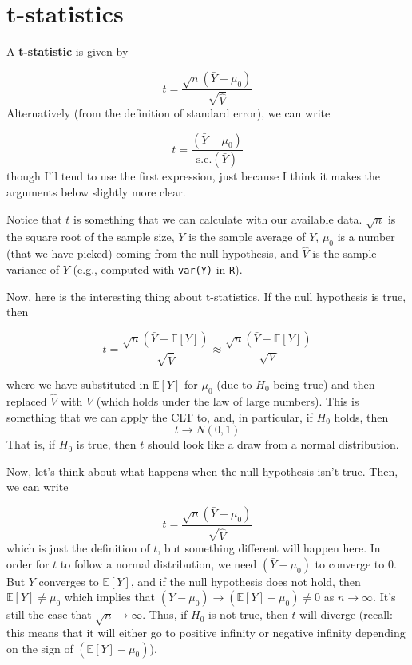 \documentclass[
  letterpaper,
  DIV=11,
  numbers=noendperiod]{scrreprt}
\begin{document}
\section{t-statistics}\label{t-statistics}

A \textbf{t-statistic} is given by

\[
  t = \frac{\sqrt{n} (\bar{Y} - \mu_0)}{\sqrt{\hat{V}}}
\] Alternatively (from the definition of standard error), we can write

\[
  t = \frac{(\bar{Y} - \mu_0)}{\textrm{s.e.}(\bar{Y})}
\] though I'll tend to use the first expression, just because I think it
makes the arguments below slightly more clear.

Notice that \(t\) is something that we can calculate with our available
data. \(\sqrt{n}\) is the square root of the sample size, \(\bar{Y}\) is
the sample average of \(Y\), \(\mu_0\) is a number (that we have picked)
coming from the null hypothesis, and \(\hat{V}\) is the sample variance
of \(Y\) (e.g., computed with \texttt{var(Y)} in \texttt{R}).

Now, here is the interesting thing about t-statistics. If the null
hypothesis is true, then

\[
  t = \frac{\sqrt{n} (\bar{Y} - \mathbb{E}[Y])}{\sqrt{\hat{V}}} \approx \frac{\sqrt{n} (\bar{Y} - \mathbb{E}[Y])}{\sqrt{V}}
\]

where we have substituted in \(\mathbb{E}[Y]\) for \(\mu_0\) (due to
\(H_0\) being true) and then replaced \(\hat{V}\) with \(V\) (which
holds under the law of large numbers). This is something that we can
apply the CLT to, and, in particular, if \(H_0\) holds, then \[
  t \rightarrow N(0,1)
\] That is, if \(H_0\) is true, then \(t\) should look like a draw from
a normal distribution.

Now, let's think about what happens when the null hypothesis isn't true.
Then, we can write

\[
  t = \frac{\sqrt{n} (\bar{Y} - \mu_0)}{\sqrt{\hat{V}}}
\] which is just the definition of \(t\), but something different will
happen here. In order for \(t\) to follow a normal distribution, we need
\((\bar{Y} - \mu_0)\) to converge to 0. But \(\bar{Y}\) converges to
\(\mathbb{E}[Y]\), and if the null hypothesis does not hold, then
\(\mathbb{E}[Y] \neq \mu_0\) which implies that
\((\bar{Y} - \mu_0) \rightarrow (\mathbb{E}[Y] - \mu_0) \neq 0\) as
\(n \rightarrow \infty\). It's still the case that
\(\sqrt{n} \rightarrow \infty\). Thus, if \(H_0\) is not true, then
\(t\) will diverge (recall: this means that it will either go to
positive infinity or negative infinity depending on the sign of
\((\mathbb{E}[Y] - \mu_0)\)).
\end{document}
